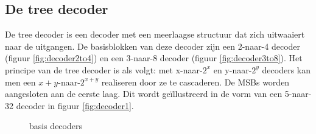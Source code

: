 \subsection{De tree decoder}
De tree decoder is een decoder met een meerlaagse structuur dat zich uitwaaiert naar de uitgangen. De basisblokken van deze decoder zijn een 2-naar-4 decoder (figuur \ref{fig:decoder2to4}) en een 3-naar-8 decoder (figuur \ref{fig:decoder3to8}). Het principe van de tree decoder is als volgt: met x-naar-$2^x$ en y-naar-$2^y$ decoders kan men een $x+y$-naar-$2^{x+y}$ realiseren door ze te cascaderen. De MSBs worden aangesloten aan de eerste laag. Dit wordt geïllustreerd in de vorm van een 5-naar-32 decoder in figuur \ref{fig:decoder1}. 
\begin{figure}[!ht]
\centering
{}
\caption[Basis decoders]{basis decoders}
\end{figure}

